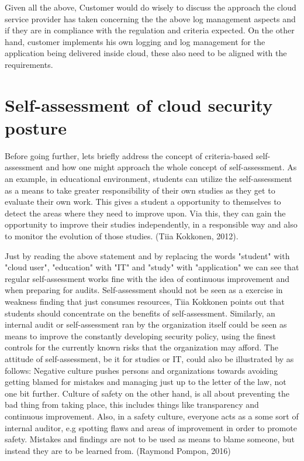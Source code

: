 \documentclass{article}
\begin{document}
\par
Given all the above, Customer would do wisely to discuss the approach the cloud service provider has taken concerning the the above log management aspects and if they are in compliance with the regulation and criteria expected. On the other hand, customer implements his own logging and log management for the application being delivered inside cloud, these also need to be aligned with the requirements.
\section{Self-assessment of cloud security posture}
Before going further, lets briefly address the concept of criteria-based self-assessment and how one might approach the whole concept of self-assessment. 
As an example, in educational environment, students can utilize the self-assessment as a means to take greater responsibility of their own studies as they get to evaluate their own work. This gives a student a opportunity to themselves to detect the areas where they need to improve upon.
Via this, they can gain the opportunity to improve their studies independently, in a responsible way and also to monitor the evolution of those studies. (Tiia Kokkonen, 2012).
\par
Just by reading the above statement and by replacing the words "student" with "cloud user", "education" with "IT" and "study" with "application" we can see that regular self-assessment works fine with the idea of continuous improvement and when preparing for audits.
Self-assessment should not be seen as a exercise in weakness finding that just consumes resources, Tiia Kokkonen points out that students should concentrate on the benefits of self-assessment.
Similarly, an internal audit or self-assessment ran by the organization itself could be seen as means to improve the constantly developing security policy, using the finest controls for the currently known risks that the organization may afford.
The attitude of self-assessment, be it for studies or IT, could also be illustrated by as follows: Negative culture pushes persons and organizations towards avoiding getting blamed for mistakes and managing just up to the letter of the law, not one bit further.
Culture of safety on the other hand, is all about preventing the bad thing from taking place, this includes things like transparency and continuous improvement. Also, in a safety culture, everyone acts as a some sort of internal auditor, e.g spotting flaws and areas of improvement in order to promote safety. Mistakes and findings are not to be used as means to blame someone, but instead they are to be learned from. (Raymond Pompon, 2016)
\end{document}

